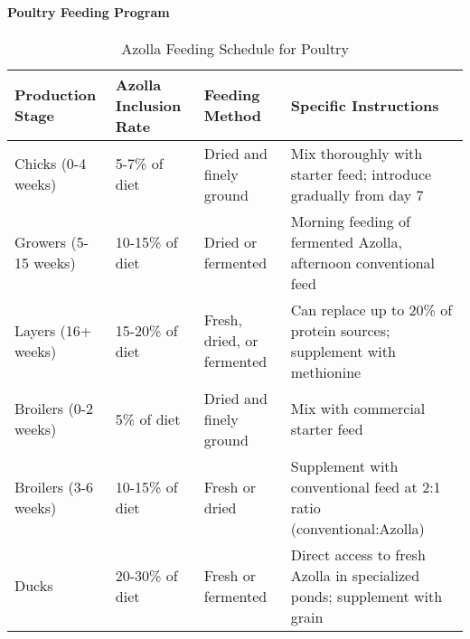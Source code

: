 \paragraph{Poultry Feeding Program}
\begin{table}[h]
\centering
\caption{Azolla Feeding Schedule for Poultry}
\label{tab:poultry_feeding}
\begin{tabular}{|p{2.5cm}|p{2.5cm}|p{2.5cm}|p{4.5cm}|}
\hline
\textbf{Production Stage} & \textbf{Azolla Inclusion Rate} & \textbf{Feeding Method} & \textbf{Specific Instructions} \\
\hline
Chicks (0-4 weeks) & 5-7\% of diet & Dried and finely ground & Mix thoroughly with starter feed; introduce gradually from day 7 \\
\hline
Growers (5-15 weeks) & 10-15\% of diet & Dried or fermented & Morning feeding of fermented Azolla, afternoon conventional feed \\
\hline
Layers (16+ weeks) & 15-20\% of diet & Fresh, dried, or fermented & Can replace up to 20\% of protein sources; supplement with methionine \\
\hline
Broilers (0-2 weeks) & 5\% of diet & Dried and finely ground & Mix with commercial starter feed \\
\hline
Broilers (3-6 weeks) & 10-15\% of diet & Fresh or dried & Supplement with conventional feed at 2:1 ratio (conventional:Azolla) \\
\hline
Ducks & 20-30\% of diet & Fresh or fermented & Direct access to fresh Azolla in specialized ponds; supplement with grain \\
\hline
\end{tabular}
\end{table}

